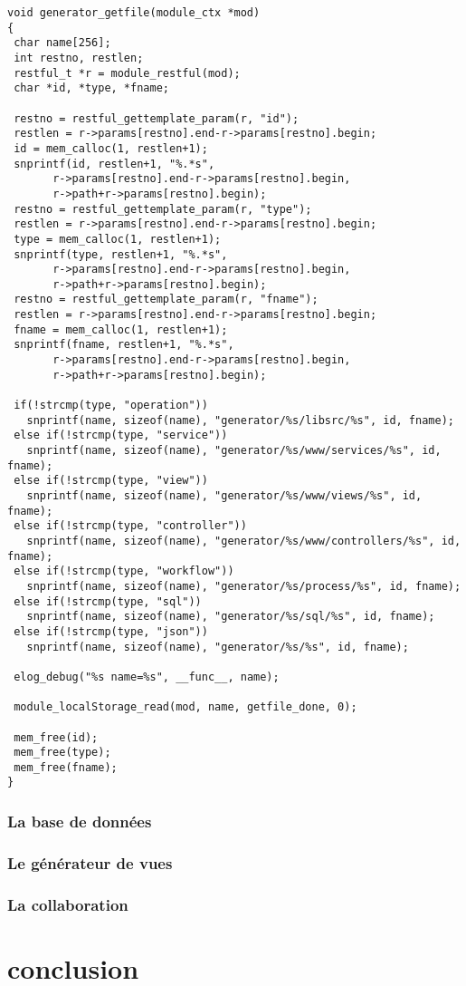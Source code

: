 \documentclass[a4paper,11pt]{report}
\begin{document}
\begin{verbatim}
void generator_getfile(module_ctx *mod)
{
 char name[256];
 int restno, restlen;
 restful_t *r = module_restful(mod);
 char *id, *type, *fname;

 restno = restful_gettemplate_param(r, "id");
 restlen = r->params[restno].end-r->params[restno].begin;
 id = mem_calloc(1, restlen+1);
 snprintf(id, restlen+1, "%.*s",
	   r->params[restno].end-r->params[restno].begin,
	   r->path+r->params[restno].begin);
 restno = restful_gettemplate_param(r, "type");
 restlen = r->params[restno].end-r->params[restno].begin;
 type = mem_calloc(1, restlen+1);
 snprintf(type, restlen+1, "%.*s",
	   r->params[restno].end-r->params[restno].begin,
	   r->path+r->params[restno].begin);
 restno = restful_gettemplate_param(r, "fname");
 restlen = r->params[restno].end-r->params[restno].begin;
 fname = mem_calloc(1, restlen+1);
 snprintf(fname, restlen+1, "%.*s",
	   r->params[restno].end-r->params[restno].begin,
	   r->path+r->params[restno].begin);

 if(!strcmp(type, "operation"))
   snprintf(name, sizeof(name), "generator/%s/libsrc/%s", id, fname);
 else if(!strcmp(type, "service"))
   snprintf(name, sizeof(name), "generator/%s/www/services/%s", id, fname);
 else if(!strcmp(type, "view"))
   snprintf(name, sizeof(name), "generator/%s/www/views/%s", id, fname);
 else if(!strcmp(type, "controller"))
   snprintf(name, sizeof(name), "generator/%s/www/controllers/%s", id, fname);
 else if(!strcmp(type, "workflow"))
   snprintf(name, sizeof(name), "generator/%s/process/%s", id, fname);
 else if(!strcmp(type, "sql"))
   snprintf(name, sizeof(name), "generator/%s/sql/%s", id, fname);
 else if(!strcmp(type, "json"))
   snprintf(name, sizeof(name), "generator/%s/%s", id, fname);

 elog_debug("%s name=%s", __func__, name);

 module_localStorage_read(mod, name, getfile_done, 0);

 mem_free(id);
 mem_free(type);
 mem_free(fname);
}

\end{verbatim}


\subsection{La base de données}
\subsection{Le générateur de vues}

\subsection{La collaboration}


\chapter{conclusion}
\end{document}
